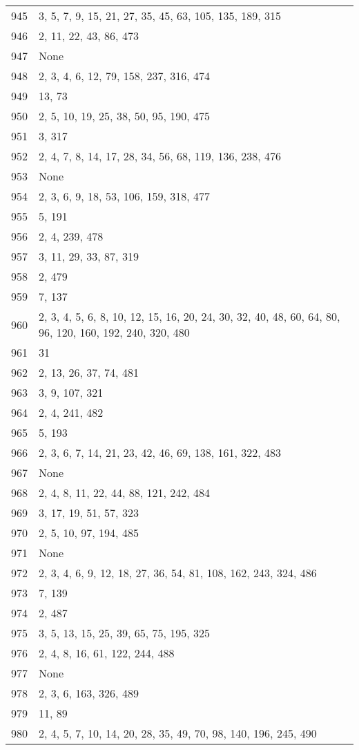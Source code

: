\documentclass[12pt]{article}
\begin{document}
\begin{tabular}{|r|l|}
945 & 3, 5,  7, 9, 15, 21, 27, 35, 45, 63, 105, 135, 189, 315 \\ 
946 & 2, 11,  22, 43, 86, 473 \\ 
947 & None \\ 
948 & 2, 3, 4, 6, 12, 79, 158, 237, 316, 474 \\ 
949 & 13, 73 \\ 
950 & 2, 5, 10, 19, 25, 38, 50, 95, 190, 475 \\ 
951 & 3, 317 \\ 
952 & 2, 4, 7, 8, 14, 17, 28, 34, 56, 68, 119, 136, 238, 476 \\ 
953 & None \\ 
954 & 2, 3, 6, 9, 18, 53, 106, 159, 318, 477 \\ 
955 & 5, 191 \\ 
956 & 2, 4, 239, 478 \\ 
957 & 3, 11, 29, 33, 87, 319 \\ 
958 & 2, 479 \\ 
959 & 7, 137 \\ 
960 & 2, 3, 4, 5, 6,  8, 10, 12, 15, 16, 20, 24, 30, 32, 40, 48, 60, 64, 80, 96, 120, 160, 192, 240, 320, 480 \\ 
961 & 31 \\ 
962 & 2, 13,  26, 37, 74, 481 \\ 
963 & 3, 9, 107, 321 \\ 
964 & 2, 4, 241, 482 \\ 
965 & 5, 193 \\ 
966 & 2, 3, 6, 7, 14, 21, 23, 42, 46, 69, 138, 161, 322, 483 \\ 
967 & None \\ 
968 & 2, 4, 8, 11, 22, 44, 88, 121, 242, 484 \\ 
969 & 3, 17, 19, 51, 57, 323 \\ 
970 & 2, 5, 10, 97, 194, 485 \\ 
971 & None \\ 
972 & 2, 3, 4, 6, 9, 12, 18, 27, 36,  54, 81, 108, 162, 243, 324, 486 \\ 
973 & 7, 139 \\ 
974 & 2, 487 \\ 
975 & 3, 5, 13, 15, 25, 39, 65, 75, 195, 325 \\ 
976 & 2, 4, 8, 16, 61, 122, 244, 488 \\ 
977 & None \\ 
978 & 2,  3, 6, 163, 326, 489 \\ 
979 & 11,  89 \\ 
980 & 2, 4, 5, 7, 10, 14, 20, 28, 35, 49, 70, 98, 140, 196, 245, 490 \\ 

\end{tabular}
\end{document}
